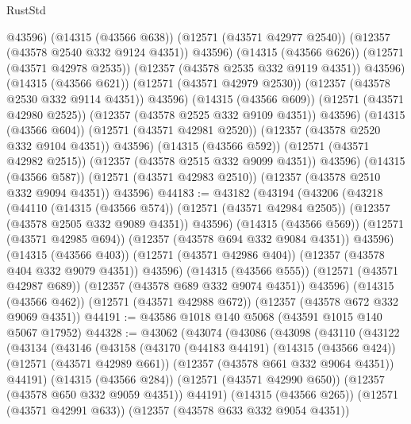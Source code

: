 \begin{lexlean}{RustStd}
\begin{coremodule}
                    @43596)
                  (@14315 (@43566 @638))
                  (@12571 (@43571 @42977 @2540))
                  (@12357 (@43578 @2540 @332 @9124 @4351))
                  @43596)
                (@14315 (@43566 @626))
                (@12571 (@43571 @42978 @2535))
                (@12357 (@43578 @2535 @332 @9119 @4351))
                @43596)
              (@14315 (@43566 @621))
              (@12571 (@43571 @42979 @2530))
              (@12357 (@43578 @2530 @332 @9114 @4351))
              @43596)
            (@14315 (@43566 @609))
            (@12571 (@43571 @42980 @2525))
            (@12357 (@43578 @2525 @332 @9109 @4351))
            @43596)
          (@14315 (@43566 @604))
          (@12571 (@43571 @42981 @2520))
          (@12357 (@43578 @2520 @332 @9104 @4351))
          @43596)
        (@14315 (@43566 @592))
        (@12571 (@43571 @42982 @2515))
        (@12357 (@43578 @2515 @332 @9099 @4351))
        @43596)
      (@14315 (@43566 @587))
      (@12571 (@43571 @42983 @2510))
      (@12357 (@43578 @2510 @332 @9094 @4351))
      @43596)
@44183 := @43182
    (@43194
      (@43206
        (@43218
          (@44110
            (@14315 (@43566 @574))
            (@12571 (@43571 @42984 @2505))
            (@12357 (@43578 @2505 @332 @9089 @4351))
            @43596)
          (@14315 (@43566 @569))
          (@12571 (@43571 @42985 @694))
          (@12357 (@43578 @694 @332 @9084 @4351))
          @43596)
        (@14315 (@43566 @403))
        (@12571 (@43571 @42986 @404))
        (@12357 (@43578 @404 @332 @9079 @4351))
        @43596)
      (@14315 (@43566 @555))
      (@12571 (@43571 @42987 @689))
      (@12357 (@43578 @689 @332 @9074 @4351))
      @43596)
    (@14315 (@43566 @462))
    (@12571 (@43571 @42988 @672))
    (@12357 (@43578 @672 @332 @9069 @4351))
@44191 := @43586 @1018 @140 @5068 (@43591 @1015 @140 @5067 @17952)
@44328 := @43062
    (@43074
      (@43086
        (@43098
          (@43110
            (@43122
              (@43134
                (@43146
                  (@43158
                    (@43170
                      (@44183 @44191)
                      (@14315 (@43566 @424))
                      (@12571 (@43571 @42989 @661))
                      (@12357 (@43578 @661 @332 @9064 @4351))
                      @44191)
                    (@14315 (@43566 @284))
                    (@12571 (@43571 @42990 @650))
                    (@12357 (@43578 @650 @332 @9059 @4351))
                    @44191)
                  (@14315 (@43566 @265))
                  (@12571 (@43571 @42991 @633))
                  (@12357 (@43578 @633 @332 @9054 @4351))

\end{coremodule}
\end{lexlean}
